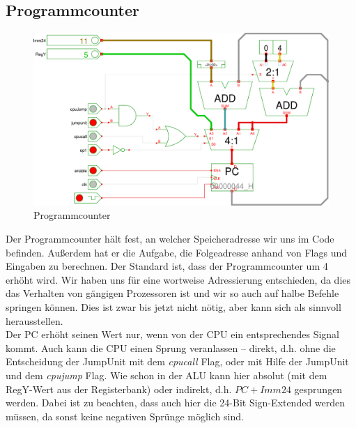 \subsection{Programmcounter}
\begin{figure}[!ht]
\centering
\includegraphics[width=1\textwidth]{images/pc.eps}
\caption{\label{HW:PC}Programmcounter}
\end{figure}
Der Programmcounter hält fest, an welcher Speicheradresse wir uns im Code befinden. Außerdem hat er die Aufgabe, die Folgeadresse anhand von Flags und Eingaben zu berechnen.
Der Standard ist, dass der Programmcounter um 4 erhöht wird. Wir haben uns für eine wortweise Adressierung entschieden, da dies das Verhalten von gängigen Prozessoren ist und wir so auch auf halbe Befehle springen können. Dies ist zwar bis jetzt nicht nötig, aber kann sich als sinnvoll herausstellen.\\
Der PC erhöht seinen Wert nur, wenn von der CPU ein entsprechendes Signal kommt. Auch kann die CPU einen Sprung veranlassen -- direkt, d.h. ohne die Entscheidung der JumpUnit mit dem \emph{cpucall} Flag, oder mit Hilfe der JumpUnit und dem \emph{cpujump} Flag. Wie schon in der ALU kann hier absolut (mit dem RegY-Wert aus der Registerbank) oder indirekt, d.h. $PC+Imm24$ gesprungen werden. Dabei ist zu beachten, dass auch hier die 24-Bit Sign-Extended werden müssen, da sonst keine negativen Sprünge möglich sind.

